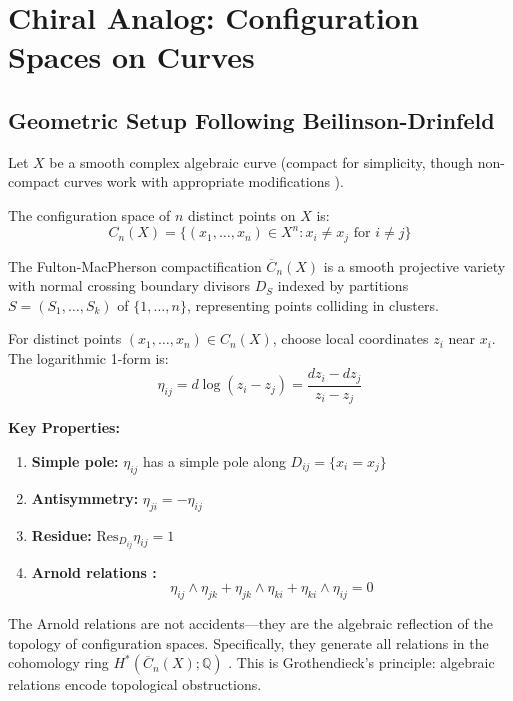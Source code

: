 \section{Chiral Analog: Configuration Spaces on Curves}
\label{sec:chiral-analog}

\subsection{Geometric Setup Following Beilinson-Drinfeld}

Let $X$ be a smooth complex algebraic curve (compact for simplicity, though non-compact curves work with appropriate modifications \cite{BD04, Chapter 3}).

\begin{definition}
The configuration space of $n$ distinct points on $X$ is:
$$C_n(X) = \{(x_1, \ldots, x_n) \in X^n : x_i \neq x_j \text{ for } i \neq j\}$$

The Fulton-MacPherson compactification $\overline{C}_n(X)$ \cite{FM94} is a smooth projective variety with normal crossing boundary divisors $D_S$ indexed by partitions $S = (S_1, \ldots, S_k)$ of $\{1, \ldots, n\}$, representing points colliding in clusters.
\end{definition}

\begin{construction}
For distinct points $(x_1, \ldots, x_n) \in C_n(X)$, choose local coordinates $z_i$ near $x_i$. The logarithmic 1-form is:
$$\eta_{ij} = d\log(z_i - z_j) = \frac{dz_i - dz_j}{z_i - z_j}$$

\textbf{Key Properties:}
\begin{enumerate}
\item \textbf{Simple pole:} $\eta_{ij}$ has a simple pole along $D_{ij} = \{x_i = x_j\}$
\item \textbf{Antisymmetry:} $\eta_{ji} = -\eta_{ij}$
\item \textbf{Residue:} $\text{Res}_{D_{ij}} \eta_{ij} = 1$
\item \textbf{Arnold relations \cite{arnold}:} 
   $$\eta_{ij} \wedge \eta_{jk} + \eta_{jk} \wedge \eta_{ki} + \eta_{ki} \wedge \eta_{ij} = 0$$
\end{enumerate}
\end{construction}

\begin{remark}
The Arnold relations are not accidents---they are the algebraic reflection of the topology of configuration spaces. Specifically, they generate all relations in the cohomology ring $H^*(\overline{C}_n(X); \mathbb{Q})$ \cite{OS80, FM94}. This is Grothendieck's principle: algebraic relations encode topological obstructions.
\end{remark}

